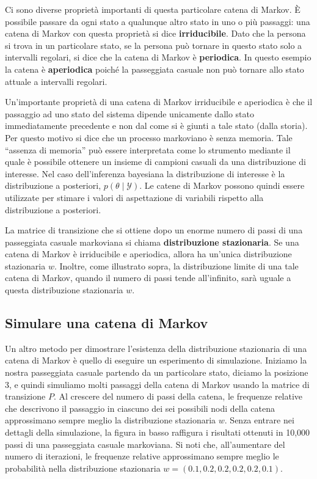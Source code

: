 \documentclass[
]{memoir}
\begin{document}
Ci sono diverse proprietà importanti di questa particolare catena di Markov. È possibile passare da ogni stato a qualunque altro stato in uno o più passaggi: una catena di Markov con questa proprietà si dice \textbf{irriducibile}. Dato che la persona si trova in un particolare stato, se la persona può tornare in questo stato solo a intervalli regolari, si dice che la catena di Markov è \textbf{periodica}. In questo esempio la catena è \textbf{aperiodica} poiché la passeggiata casuale non può tornare allo stato attuale a intervalli regolari.

Un'importante proprietà di una catena di Markov irriducibile e aperiodica è che il passaggio ad uno stato del sistema dipende unicamente dallo stato immediatamente precedente e non dal come si è giunti a tale stato (dalla storia). Per questo motivo si dice che un processo markoviano è senza memoria. Tale ``assenza di memoria'' può essere interpretata come lo strumento mediante il quale è possibile ottenere un insieme di campioni casuali da una distribuzione di interesse. Nel caso dell'inferenza bayesiana la distribuzione di interesse è la distribuzione a posteriori, \(p(\theta \mid \mathcal{Y})\). Le catene di Markov possono quindi essere utilizzate per stimare i valori di aspettazione di variabili rispetto alla distribuzione a posteriori.

La matrice di transizione che si ottiene dopo un enorme numero di passi di una passeggiata casuale markoviana si chiama \textbf{distribuzione stazionaria}. Se una catena di Markov è irriducibile e aperiodica, allora ha un'unica distribuzione stazionaria \(w\). Inoltre, come illustrato sopra, la distribuzione limite di una tale catena di Markov, quando il numero di passi tende all'infinito, sarà uguale a questa distribuzione stazionaria \(w\).

\hypertarget{simulare-una-catena-di-markov}{%
\subsection{Simulare una catena di Markov}\label{simulare-una-catena-di-markov}}

Un altro metodo per dimostrare l'esistenza della distribuzione stazionaria di una catena di Markov è quello di eseguire un esperimento di simulazione. Iniziamo la nostra passeggiata casuale partendo da un particolare stato, diciamo la posizione 3, e quindi simuliamo molti passaggi della catena di Markov usando la matrice di transizione \(P\). Al crescere del numero di passi della catena, le frequenze relative che descrivono il passaggio in ciascuno dei sei possibili nodi della catena approssimano sempre meglio la distribuzione stazionaria \(w\). Senza entrare nei dettagli della simulazione, la figura in basso raffigura i risultati ottenuti in 10,000 passi di una passeggiata casuale markoviana. Si noti che, all'aumentare del numero di iterazioni, le frequenze relative approssimano sempre meglio le probabilità nella distribuzione stazionaria \(w = (0.1, 0.2, 0.2, 0.2, 0.2, 0.1)\).
\end{document}
